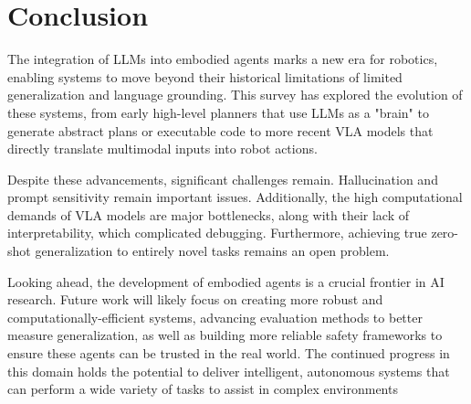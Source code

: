 \documentclass[11pt]{article}
\begin{document}
\section{Conclusion}
The integration of LLMs into embodied agents marks a new era for robotics, enabling systems to move beyond their historical limitations of limited generalization and language grounding. This survey has explored the evolution of these systems, from early high-level planners that use LLMs as a "brain" to generate abstract plans or executable code to more recent VLA models that directly translate multimodal inputs into robot actions.

Despite these advancements, significant challenges remain. Hallucination and prompt sensitivity remain important issues. Additionally, the high computational demands of VLA models are major bottlenecks, along with their lack of interpretability, which complicated debugging. Furthermore, achieving true zero-shot generalization to entirely novel tasks remains an open problem.

Looking ahead, the development of embodied agents is a crucial frontier in AI research. Future work will likely focus on creating more robust and computationally-efficient systems, advancing evaluation methods to better measure generalization, as well as building more reliable safety frameworks to ensure these agents can be trusted in the real world. The continued progress in this domain holds the potential to deliver intelligent, autonomous systems that can perform a wide variety of tasks to assist in complex environments


\nocite{wooldridge1995intelligent, wang2023survey, vaswani2017attention,jordan1986serial,hochreiter1997long,wei2021finetuned,ouyang2022rlhf, brown2020lmszeroshotlearn, wei2022chainofthought, ahn2022saycan, driess2023palme, shah2022lmnav,song2022llmplan,zhou2023isrllm, wei2022cot, brohan2022rt1, brohan2023rt2, geminiroboticsteam2025, kim2024openvla, sarch2023helper, sarch2024helperx, wang2023voyager, liang2022cap, chen2023palijointlyscaledmultilinguallanguageimage, chowdhery2022palmscalinglanguagemodeling, deitke2020robothoropensimulationtorealembodied, fang2019scenetransformer, li2025embodiedagentinterfacebenchmarking, mao2025agentsafesafeguardinglargelanguage, nguyen2020robotobject, radford2021learningtransferablevisualmodels, Shah_2021, shridhar2020alfredbenchmarkinterpretinggrounded, yang2025embodiedbenchcomprehensivebenchmarkingmultimodal, yin2025safeagentbenchbenchmarksafetask, zhou2025exploringlimitsvisionlanguageactionmanipulations, openai2024gpt4technicalreport, touvron2023llamaopenefficientfoundation}


%

\end{document}
